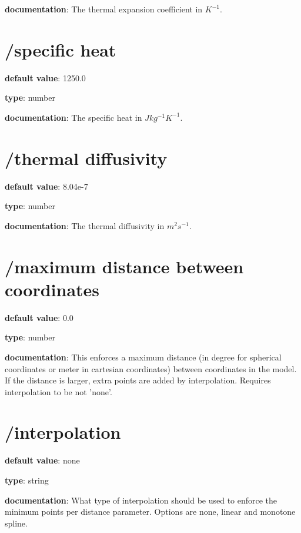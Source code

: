 \begin{itemized}
\item {\bf documentation}: The thermal expansion coefficient in $K^{-1}$.
\end{itemized}\section{/specific heat} \begin{itemized}
\item {\bf default value}: 1250.0
\item {\bf type}: number
\item {\bf documentation}: The specific heat in $J kg^{-1} K^{-1}.$
\end{itemized}\section{/thermal diffusivity} \begin{itemized}
\item {\bf default value}: 8.04e-7
\item {\bf type}: number
\item {\bf documentation}: The thermal diffusivity in $m^{2} s^{-1}$.
\end{itemized}\section{/maximum distance between coordinates} \begin{itemized}
\item {\bf default value}: 0.0
\item {\bf type}: number
\item {\bf documentation}: This enforces a maximum distance (in degree for spherical coordinates or meter in cartesian coordinates) between coordinates in the model. If the distance is larger, extra points are added by interpolation. Requires interpolation to be not 'none'.
\end{itemized}\section{/interpolation} \begin{itemized}
\item {\bf default value}: none
\item {\bf type}: string
\item {\bf documentation}: What type of interpolation should be used to enforce the minimum points per distance parameter. Options are none, linear and monotone spline.

\end{itemized}
